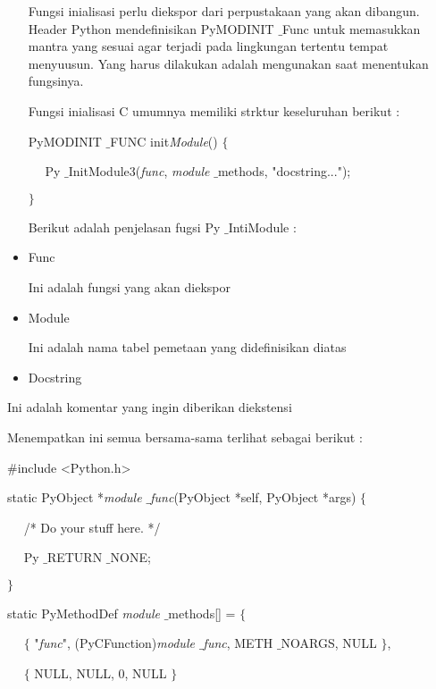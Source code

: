 \begin{itemize}
 \hspace*{0.5in} Fungsi inialisasi perlu diekspor dari perpustakaan yang akan dibangun. Header Python mendefinisikan PyMODINIT $  \_  $Func untuk memasukkan mantra yang sesuai agar terjadi pada lingkungan tertentu tempat menyuusun. Yang harus dilakukan adalah mengunakan saat menentukan fungsinya. 

 \hspace*{0.5in} Fungsi inialisasi C umumnya memiliki strktur keseluruhan berikut : 

PyMODINIT $  \_  $FUNC init\textit{Module}()  $  \{  $ 

~~ Py $  \_  $InitModule3(\textit{func}, \textit{module} $  \_  $methods, "docstring..."); 

 $  \}  $ 
\vspace{12pt}

Berikut adalah penjelasan fugsi Py $  \_  $IntiModule : 

\item Func  

Ini adalah fungsi yang akan diekspor 

\item Module 

Ini adalah nama tabel pemetaan yang didefinisikan diatas 

\item Docstring\end{itemize}
 

Ini adalah komentar yang ingin diberikan diekstensi 
\vspace{12pt}

 \hspace*{0.5in} Menempatkan ini semua bersama-sama terlihat sebagai berikut : 

 $  \#  $include <Python.h>
\vspace{12pt}

static PyObject *\textit{module $  \_  $func}(PyObject *self, PyObject *args)  $  \{  $ 

~~ /* Do your stuff here. */ 

~~ Py $  \_  $RETURN $  \_  $NONE; 

 $  \}  $ 
\vspace{12pt}

static PyMethodDef \textit{module} $  \_  $methods[] =  $  \{  $ 

~~  $  \{  $ "\textit{func}", (PyCFunction)\textit{module $  \_  $func}, METH $  \_  $NOARGS, NULL  $  \}  $, 
 
~~  $  \{  $ NULL, NULL, 0, NULL  $  \}  $ 

